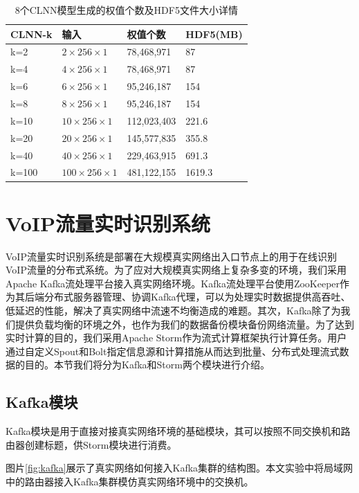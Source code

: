 \begin{table}
  \caption{8个CLNN模型生成的权值个数及HDF5文件大小详情}
  \label{tab:params}
  \centering
  \begin{tabular}{l l l l}
    \hline
    \textbf{CLNN-k} & \textbf{输入} & \textbf{权值个数}&\textbf{HDF5(MB)}\\
    \hline
    k=2      & ${2 \times 256 \times 1}$  & 78,468,971  &87  \\
    k=4      & ${4 \times 256 \times 1}$  & 78,468,971  &87  \\
    k=6      & ${6 \times 256 \times 1}$  & 95,246,187  &154  \\
    k=8      & ${8 \times 256 \times 1}$  & 95,246,187  &154 \\
    k=10     & ${10 \times 256 \times 1}$  & 112,023,403  &221.6  \\
    k=20     & ${20 \times 256 \times 1}$  & 145,577,835  &355.8 \\
    k=40     & ${40 \times 256 \times 1}$  & 229,463,915  &691.3  \\
    k=100    & ${100 \times 256 \times 1}$  & 481,122,155  &1619.3  \\
    \hline
  \end{tabular}
\end{table}

\section{VoIP流量实时识别系统}
VoIP流量实时识别系统是部署在大规模真实网络出入口节点上的用于在线识别VoIP流量的分布式系统。为了应对大规模真实网络上复杂多变的环境，我们采用Apache Kafka流处理平台接入真实网络环境。Kafka流处理平台使用ZooKeeper作为其后端分布式服务器管理、协调Kafka代理，可以为处理实时数据提供高吞吐、低延迟的性能，解决了真实网络中流速不均衡造成的难题。其次，Kafka除了为我们提供负载均衡的环境之外，也作为我们的数据备份模块备份网络流量。为了达到实时计算的目的，我们采用Apache Storm作为流式计算框架执行计算任务。用户通过自定义Spout和Bolt指定信息源和计算措施从而达到批量、分布式处理流式数据的目的。本节我们将分为Kafka和Storm两个模块进行介绍。

\subsection{Kafka模块}
Kafka模块是用于直接对接真实网络环境的基础模块，其可以按照不同交换机和路由器创建标题，供Storm模块进行消费。

图片\ref{fig:kafka}展示了真实网络如何接入Kafka集群的结构图。本文实验中将局域网中的路由器接入Kafka集群模仿真实网络环境中的交换机。

